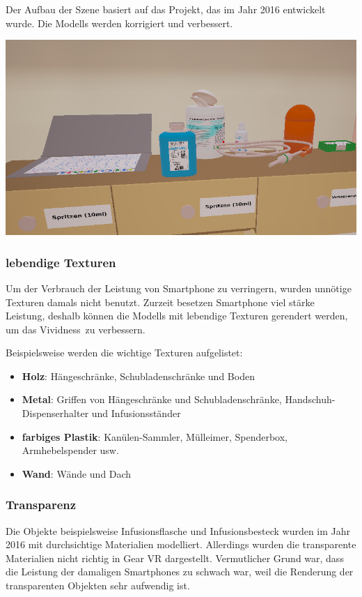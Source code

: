   Der Aufbau der Szene basiert auf das Projekt, das im Jahr 2016 entwickelt wurde\citep{26}. Die Modells werden korrigiert und verbessert.
  
  \includegraphics[width=\textwidth]{images/WithoutGlass.png}

   \subsubsection{lebendige Texturen}
   
   Um der Verbrauch der Leistung von Smartphone zu verringern, wurden unnötige Texturen damals nicht benutzt. Zurzeit besetzen Smartphone viel stärke Leistung, deshalb können die Modells mit lebendige Texturen gerendert werden, um das \glqq Vividness\grqq\ zu verbessern.
   
   Beispielsweise werden die wichtige Texturen aufgelistet:
   \begin{itemize}
       \item \textbf{Holz}: Hängeschränke, Schubladenschränke und Boden
       \item \textbf{Metal}: Griffen von Hängeschränke und Schubladenschränke, Handschuh-Dispenserhalter und Infusionsständer
       \item \textbf{farbiges Plastik}: Kanülen-Sammler,  Mülleimer, Spenderbox, Armhebelspender usw.
       \item \textbf{Wand}: Wände und Dach
   \end{itemize}
   
   \subsubsection{Transparenz}
   Die Objekte beispielsweise Infusionsflasche und Infusionsbesteck wurden im Jahr 2016 mit durchsichtige Materialien modelliert. Allerdings wurden die transparente Materialien nicht richtig in Gear VR dargestellt. Vermutlicher Grund war, dass die Leistung der damaligen Smartphones zu schwach war, weil die Renderung der transparenten Objekten sehr aufwendig ist.
   
